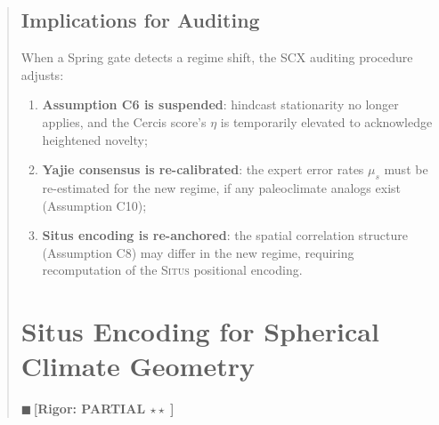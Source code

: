 \documentclass[11pt,a4paper]{article}
\theoremstyle{plain}
\theoremstyle{definition}
\theoremstyle{remark}
\newcommand{\rigorPartial}{{\color{rigorPartial}$\blacksquare$\,\textbf{[Rigor: PARTIAL $\star\star\;$]}}}
\newcommand{\Situs}{\textsc{Situs}}
\begin{document}
\begin{abstract}
\subsection{Implications for Auditing}
When a Spring gate detects a regime shift, the SCX auditing procedure adjusts:
\begin{enumerate}[label=(\roman*)]
  \item \textbf{Assumption C6 is suspended}: hindcast stationarity no longer
    applies, and the Cercis score's $\eta$ is temporarily elevated to
    acknowledge heightened novelty;
  \item \textbf{Yajie consensus is re-calibrated}: the expert error rates
    $\mu_s$ must be re-estimated for the new regime, if any paleoclimate analogs
    exist (Assumption C10);
  \item \textbf{Situs encoding is re-anchored}: the spatial correlation
    structure (Assumption C8) may differ in the new regime, requiring
    recomputation of the \Situs{} positional encoding.
\end{enumerate}
\section{Situs Encoding for Spherical Climate Geometry}
\label{sec:situs-climate}
\rigorPartial

\end{abstract}
\end{document}
